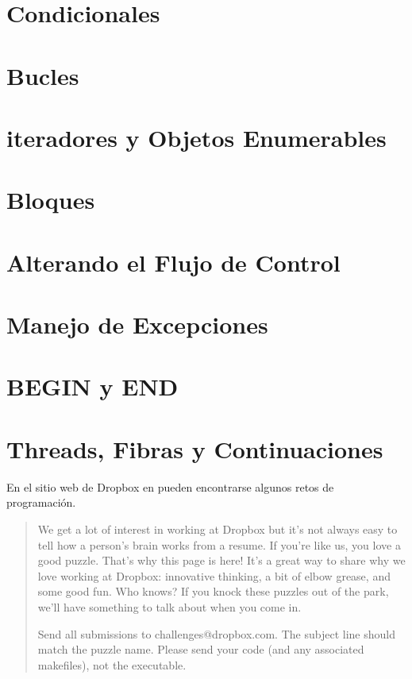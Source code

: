 \section{Condicionales}

\section{Bucles}

\section{iteradores y Objetos Enumerables}

\section{Bloques}

\section{Alterando el Flujo de Control}

\section{Manejo de Excepciones}

\section{BEGIN y END}

\section{Threads, Fibras y Continuaciones}

En el sitio web de Dropbox en
pueden encontrarse algunos retos de programación.

\begin{it}
\begin{quote}
We get a lot of interest in working at Dropbox but it's not always easy to tell how a person's brain works from a resume. If you're like us, you love a good puzzle. That's why this page is here! It's a great way to share why we love working at Dropbox: innovative thinking, a bit of elbow grease, and some good fun. Who knows? If you knock these puzzles out of the park, we'll have something to talk about when you come in.


Send all submissions to challenges@dropbox.com. The subject line should match the puzzle name. Please send your code (and any associated makefiles), not the executable.
\end{quote}
\end{it}

